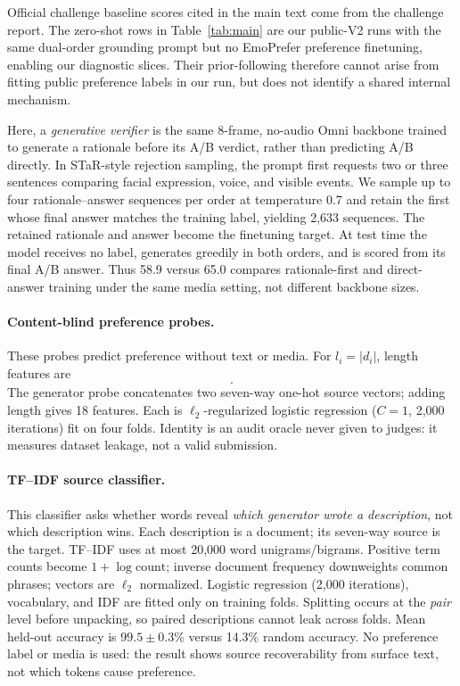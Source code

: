 Official challenge baseline scores cited in the main text come from the challenge report. The zero-shot rows in Table~\ref{tab:main} are our public-V2 runs with the same dual-order grounding prompt but no EmoPrefer preference finetuning, enabling our diagnostic slices. Their prior-following therefore cannot arise from fitting public preference labels in our run, but does not identify a shared internal mechanism.

Here, a \emph{generative verifier} is the same 8-frame, no-audio Omni backbone trained to generate a rationale before its A/B verdict, rather than predicting A/B directly. In STaR-style rejection sampling, the prompt first requests two or three sentences comparing facial expression, voice, and visible events. We sample up to four rationale--answer sequences per order at temperature 0.7 and retain the first whose final answer matches the training label, yielding 2,633 sequences. The retained rationale and answer become the finetuning target. At test time the model receives no label, generates greedily in both orders, and is scored from its final A/B answer. Thus 58.9 versus 65.0 \waf compares rationale-first and direct-answer training under the same media setting, not different backbone sizes.

\paragraph{Content-blind preference probes.}
These probes predict preference without text or media. For $l_i=|d_i|$, length features are
\begin{equation*}
 [l_1/1000,\;l_2/1000,\;(l_1-l_2)/1000,\;\log((l_1+1)/(l_2+1))].
\end{equation*}
The generator probe concatenates two seven-way one-hot source vectors; adding length gives 18 features. Each is $\ell_2$-regularized logistic regression ($C=1$, 2,000 iterations) fit on four folds. Identity is an audit oracle never given to judges: it measures dataset leakage, not a valid submission.

\paragraph{TF--IDF source classifier.}
This classifier asks whether words reveal \emph{which generator wrote a description}, not which description wins. Each description is a document; its seven-way source is the target. TF--IDF uses at most 20,000 word unigrams/bigrams. Positive term counts become $1+\log \mathrm{count}$; inverse document frequency downweights common phrases; vectors are $\ell_2$ normalized. Logistic regression (2,000 iterations), vocabulary, and IDF are fitted only on training folds. Splitting occurs at the \emph{pair} level before unpacking, so paired descriptions cannot leak across folds. Mean held-out accuracy is $99.5\mathbin{\pm}0.3$\% versus 14.3\% random accuracy. No preference label or media is used: the result shows source recoverability from surface text, not which tokens cause preference.

